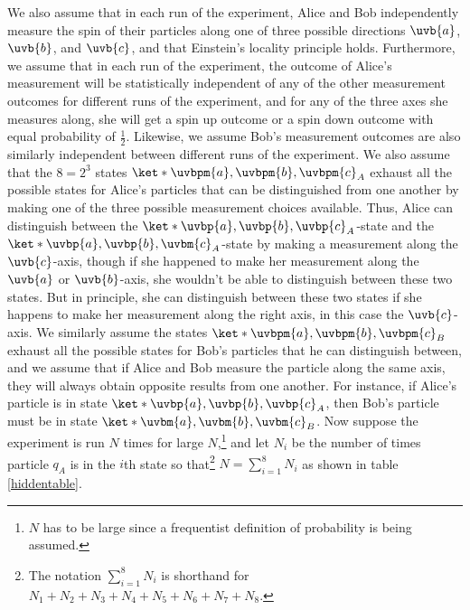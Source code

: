 \documentclass[12pt]{report}
\providecommand{\DIFadd}[1]{{\protect\color{blue}\uwave{#1}}} %
\providecommand{\DIFdel}[1]{{\protect\color{red}\sout{#1}}}                      %
\providecommand{\DIFaddbegin}{} %
\providecommand{\DIFaddend}{} %
\providecommand{\DIFdelbegin}{} %
\providecommand{\DIFdelend}{} %
\begin{document}
We also assume that in each run of the experiment, Alice and Bob independently measure the spin of their particles along one of three possible directions $\uvb{a}$, $\uvb{b}$, and $\uvb{c}$, and that Einstein's locality principle holds. Furthermore, we assume that in each run of the experiment, the outcome of Alice's measurement will be statistically independent of any of the other measurement outcomes for different runs of the experiment, and for any of the three axes she measures along, she will get a spin up outcome or a spin down outcome with equal probability of $\frac{1}{2}.$ Likewise, we assume Bob's measurement outcomes are also similarly independent between different runs of the experiment. We also assume that the $8=2^3$ states \DIFdelbegin \DIFdel{$\ket*{\uvbpm{a},\uvbpm{b},\uvbpm{c}}_A$ }\DIFdelend \DIFaddbegin \DIFadd{$\ket*{\uvbpm{a};\uvbpm{b};\uvbpm{c}}_A$ }\DIFaddend exhaust all the possible states for Alice's particles that can be distinguished from one another by making one of the three possible measurement choices available. Thus, Alice can distinguish between the \DIFdelbegin \DIFdel{$\ket*{\uvbp{a},\uvbp{b},\uvbp{c}}_A$}\DIFdelend \DIFaddbegin \DIFadd{$\ket*{\uvbp{a};\uvbp{b};\uvbp{c}}_A$}\DIFaddend -state and the \DIFdelbegin \DIFdel{$\ket*{\uvbp{a},\uvbp{b},\uvbm{c}}_A$}\DIFdelend \DIFaddbegin \DIFadd{$\ket*{\uvbp{a};\uvbp{b};\uvbm{c}}_A$}\DIFaddend -state by making a measurement along the $\uvb{c}$-axis, though if she happened to make her measurement along the $\uvb{a}$ or $\uvb{b}$-axis, she wouldn't be able to distinguish between these two states. But in principle, she can distinguish between these two states if she happens to make her measurement along the right axis, in this case the $\uvb{c}$-axis. We similarly assume the states \DIFdelbegin \DIFdel{$\ket*{\uvbpm{a},\uvbpm{b},\uvbpm{c}}_B$  }\DIFdelend \DIFaddbegin \DIFadd{$\ket*{\uvbpm{a};\uvbpm{b};\uvbpm{c}}_B$  }\DIFaddend exhaust all the possible states for Bob's particles that he can distinguish between, and we assume that if Alice and Bob measure the particle along the same axis, they will always obtain opposite results from one another. For instance, if Alice's particle is in state \DIFdelbegin \DIFdel{$\ket*{\uvbp{a},\uvbp{b},\uvbp{c}}_A$}\DIFdelend \DIFaddbegin \DIFadd{$\ket*{\uvbp{a};\uvbp{b};\uvbp{c}}_A$}\DIFaddend , then Bob's particle must be in state \DIFdelbegin \DIFdel{$\ket*{\uvbm{a},\uvbm{b},\uvbm{c}}_B$}\DIFdelend \DIFaddbegin \DIFadd{$\ket*{\uvbm{a};\uvbm{b};\uvbm{c}}_B$}\DIFaddend . Now suppose the experiment is run $N$ times for large $N$,\footnote{$N$ has to be large since a frequentist definition of probability is being assumed.} and let $N_i$ be the number of times particle $q_A$ is in the $i$th state so that\footnote{The notation $\sum_{i=1}^8 N_i$ is shorthand for $N_1+N_2+N_3+N_4+N_5+N_6+N_7+N_8$.  %
%
} $N=\sum_{i=1}^8 N_i$ as shown in table \ref{hiddentable}.
\end{document}
